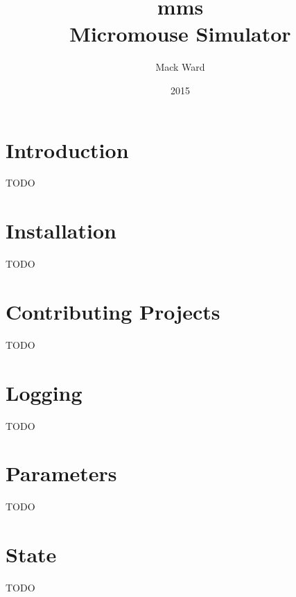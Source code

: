 \documentclass[12pt]{article}
\begin{document}
\renewcommand{\l}{\left(}
\renewcommand{\r}{\right)}

\title{\vspace{60mm}\textbf{mms}\\Micromouse Simulator}
\author{Mack Ward}
\date{2015}
\maketitle

\newpage
\renewcommand*\contentsname{Table of Contents}
\tableofcontents

\newpage
\section{Introduction}
TODO

\section{Installation}
TODO

\section{Contributing Projects}
TODO

\section{Logging}
TODO

\section{Parameters}
TODO

\section{State}
TODO
\end{document}
